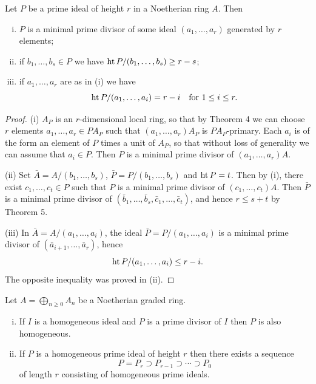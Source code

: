 \begin{theorem}\label{thm:13.6}
Let $P$ be a prime ideal of height $r$ in a Noetherian ring $A$.
Then
\begin{enumerate}[(i)]
  \item $P$ is a minimal prime divisor of some ideal $(a_1, \ldots, a_r)$ generated by
        $r$ elements;
  \item if $b_1, \ldots, b_s \in P$ we have $\operatorname{ht} P/(b_1, \ldots, b_s) \ge r - s$;
  \item if $a_1, \ldots, a_r$ are as in (i) we have
        \[
          \operatorname{ht} P/(a_1, \ldots, a_i) = r - i \quad \text{for } 1 \le i \le r.
        \]
\end{enumerate}
\end{theorem}

\begin{proof}
(i) $A_P$ is an $r$-dimensional local ring, so that by Theorem 4 we can
choose $r$ elements $a_1, \ldots, a_r \in PA_P$ such that $(a_1, \ldots, a_r)A_P$ is $PA_P$-primary.
Each $a_i$ is of the form an element of $P$ times a unit of $A_P$, so that without
loss of generality we can assume that $a_i \in P$. Then $P$ is a minimal prime
divisor of $(a_1, \ldots, a_r)A$.

(ii) Set $\bar{A} = A/(b_1, \ldots, b_s)$, $\bar{P} = P/(b_1, \ldots, b_s)$ and $\operatorname{ht} P = t$. Then by (i),
there exist $c_1, \ldots, c_t \in P$ such that $P$ is a minimal prime divisor of
$(c_1, \ldots, c_t)A$. Then $\bar{P}$ is a minimal prime divisor of $(\bar{b}_1, \ldots, \bar{b}_s, \bar{c}_1, \ldots, \bar{c}_t)$,
and hence $r \le s + t$ by Theorem 5.

(iii) In $\bar{A} = A/(a_1, \ldots, a_i)$, the ideal $\bar{P} = P/(a_1, \ldots, a_i)$ is a minimal
prime divisor of $(\bar{a}_{i+1}, \ldots, \bar{a}_r)$, hence
\[
  \operatorname{ht} P/(a_1, \ldots, a_i) \le r - i.
\]
The opposite inequality was proved in (ii).
\end{proof}

\begin{theorem}\label{thm:13.7}
Let $A = \bigoplus_{n \ge 0} A_n$ be a Noetherian graded ring.
\begin{enumerate}[(i)]
  \item If $I$ is a homogeneous ideal and $P$ is a prime divisor of $I$ then $P$ is also
        homogeneous.
  \item If $P$ is a homogeneous prime ideal of height $r$ then there exists a
        sequence
        \[
          P = P_r \supset P_{r-1} \supset \cdots \supset P_0
        \]
        of length $r$ consisting of homogeneous
        prime ideals.
\end{enumerate}
\end{theorem}

